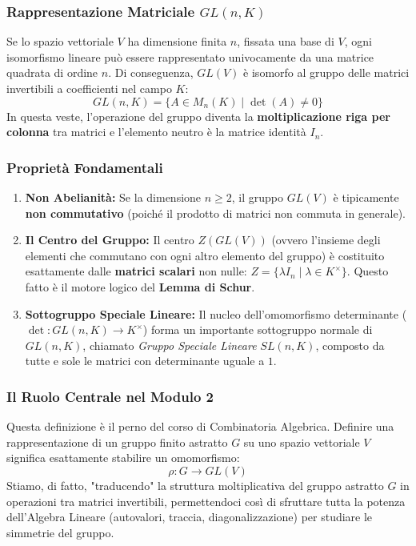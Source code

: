 \subsubsection{Rappresentazione Matriciale $GL(n, K)$}
Se lo spazio vettoriale $V$ ha dimensione finita $n$, fissata una base di $V$, ogni isomorfismo lineare può essere rappresentato univocamente da una matrice quadrata di ordine $n$. Di conseguenza, $GL(V)$ è isomorfo al gruppo delle matrici invertibili a coefficienti nel campo $K$:
$$ GL(n, K) = \{ A \in M_{n}(K) \mid \det(A) \neq 0 \} $$
In questa veste, l'operazione del gruppo diventa la \textbf{moltiplicazione riga per colonna} tra matrici e l'elemento neutro è la matrice identità $I_n$.

\subsubsection{Proprietà Fondamentali}
\begin{enumerate}
    \item \textbf{Non Abelianità:} Se la dimensione $n \ge 2$, il gruppo $GL(V)$ è tipicamente \textbf{non commutativo} (poiché il prodotto di matrici non commuta in generale).
    \item \textbf{Il Centro del Gruppo:} Il centro $Z(GL(V))$ (ovvero l'insieme degli elementi che commutano con ogni altro elemento del gruppo) è costituito esattamente dalle \textbf{matrici scalari} non nulle: $Z = \{\lambda I_n \mid \lambda \in K^\times\}$. Questo fatto è il motore logico del \textbf{Lemma di Schur}.
    \item \textbf{Sottogruppo Speciale Lineare:} Il nucleo dell'omomorfismo determinante ($\det: GL(n, K) \to K^\times$) forma un importante sottogruppo normale di $GL(n, K)$, chiamato \textit{Gruppo Speciale Lineare} $SL(n, K)$, composto da tutte e sole le matrici con determinante uguale a $1$.
\end{enumerate}

\subsubsection{Il Ruolo Centrale nel Modulo 2}
Questa definizione è il perno del corso di Combinatoria Algebrica. Definire una rappresentazione di un gruppo finito astratto $G$ su uno spazio vettoriale $V$ significa esattamente stabilire un omomorfismo:
$$ \rho: G \to GL(V) $$
Stiamo, di fatto, "traducendo" la struttura moltiplicativa del gruppo astratto $G$ in operazioni tra matrici invertibili, permettendoci così di sfruttare tutta la potenza dell'Algebra Lineare (autovalori, traccia, diagonalizzazione) per studiare le simmetrie del gruppo.

